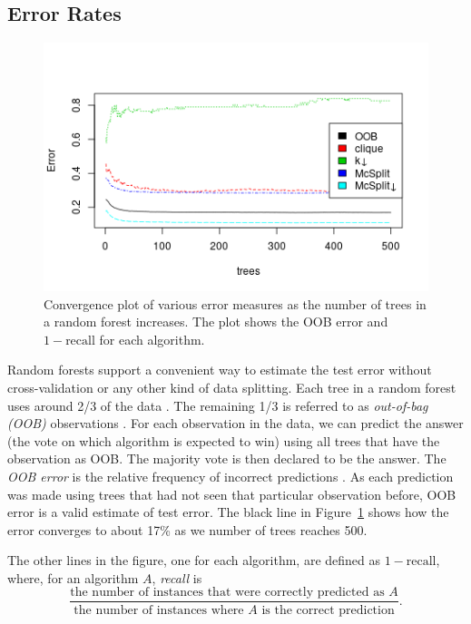 \documentclass{l4proj}
\theoremstyle{definition}
\theoremstyle{remark}
\begin{document}
\subsection{Error Rates} \label{sec:unlabelled_error_rates}

\begin{figure}
  \centering
  \includegraphics[scale=0.5]{images/unlabelled_forest_errors.png}
  \caption{Convergence plot of various error measures as the number of trees in
    a random forest increases. The plot shows the OOB error and $1 -
    \text{recall}$ for each algorithm.}
  \label{fig:unlabelled_forest_errors}
\end{figure}

Random forests support a convenient way to estimate the test error without
cross-validation or any other kind of data splitting. Each tree in a random
forest uses around 2/3 of the data \cite{James:2014:ISL:2517747}. The remaining
1/3 is referred to as \emph{out-of-bag (OOB)} observations . For each
observation in the data, we can predict the answer (the vote on which algorithm
is expected to win) using all trees that have the observation as OOB. The
majority vote is then declared to be the answer. The \emph{OOB error} is
the relative frequency of incorrect predictions \cite{James:2014:ISL:2517747}.
As each prediction was made using trees that had not seen that particular
observation before, OOB error is a valid estimate of test error. The black line
in Figure~\ref{fig:unlabelled_forest_errors} shows how the error converges to
about 17\% as we number of trees reaches 500.

The other lines in the figure, one for each algorithm, are defined as $1 -
\text{recall}$, where, for an algorithm $A$, \emph{recall}
\cite{citeulike:12882259} is
\[ \frac{\text{the number of instances that were correctly predicted as
      $A$}}{\text{the number of instances where $A$ is the correct
      prediction}}. \]
\end{document}
